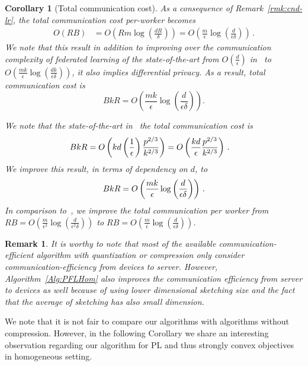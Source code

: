 \documentclass[twoside]{article}
\newtheorem{remark}{Remark}
\newtheorem{corollary}{Corollary}
\begin{document}
\begin{corollary}[Total communication cost]
As a consequence of Remark~\ref{rmk:cnd-lr}, the total communication cost per-worker becomes \begin{align}
O\left(RB\right)&=O\left(Rm\log \left(\frac{d R}{\delta}\right)\right)=O\left(\frac{m }{\epsilon}\log \left(\frac{d }{\epsilon\delta}\right)\right) \, .
\end{align}
We note that this result in addition to improving over the communication complexity of federated learning of the state-of-the-art from $O\left(\frac{d}{\epsilon}\right)$ in~\cite{karimireddy2019scaffold,wang2018cooperative,liang2019variance} to $O\left(\frac{m k}{\epsilon}\log \left(\frac{d k}{\epsilon\delta}\right)\right)$, it also implies differential privacy. As a result, total communication cost is 
$$BkR=O\left(\frac{m k}{\epsilon}\log \left(\frac{d }{\epsilon\delta}\right)\right).$$ 

We note that the state-of-the-art in~\cite{karimireddy2019scaffold} the total communication cost is 
\begin{align}\notag
    BkR&=O\left(kd\left(\frac{1}{\epsilon}\right)\frac{p^{2/3}}{k^{2/3}} \right)=O\left(\frac{kd}{\epsilon}\frac{p^{2/3}}{k^{2/3}}\right) \, .
\end{align}
We improve this result, in terms of dependency on $d$, to 
\begin{align}\notag
    BkR=O\left(\frac{m k}{\epsilon}\log \left(\frac{d }{\epsilon\delta}\right)\right) \, .
\end{align}
In comparison to~\cite{ivkin2019communication}, we improve the total communication per worker from $RB=O\left(\frac{m }{\epsilon^2}\log \left(\frac{d }{\epsilon^2\delta}\right)\right)$ to $RB=O\left(\frac{m }{\epsilon}\log \left(\frac{d }{\epsilon\delta}\right)\right)$.
\end{corollary}

\begin{remark}
It is worthy to note that most of the available communication-efficient algorithm with quantization or compression only consider communication-efficiency from devices to server. However, Algorithm~\ref{Alg:PFLHom} also improves the communication efficiency from server to devices as well because of using lower dimensional sketching size and the fact that the average of sketching has also small dimension. 
\end{remark}
We note that it is not fair to compare our algorithms with algorithms without compression. However, in the following Corollary we share an interesting observation regarding our algorithm for PL and thus strongly convex objectives in homogeneous setting. 
\end{document}
